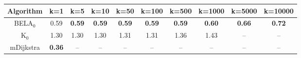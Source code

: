 \begin{tabular}{c|ccccccccc}\toprule
Algorithm & k=1 & k=5 & k=10 & k=50 & k=100 & k=500 & k=1000 & k=5000 & k=10000 \\ \midrule
BELA$_0$ & 0.59 & \textbf{0.59} & \textbf{0.59} & \textbf{0.59} & \textbf{0.59} & \textbf{0.59} & \textbf{0.60} & \textbf{0.66} & \textbf{0.72} \\
K$_0$ & 1.30 & 1.30 & 1.30 & 1.31 & 1.31 & 1.36 & 1.43 & -- & -- \\
mDijkstra & \textbf{0.36} & -- & -- & -- & -- & -- & -- & -- & -- \\ \bottomrule 
\end{tabular}
